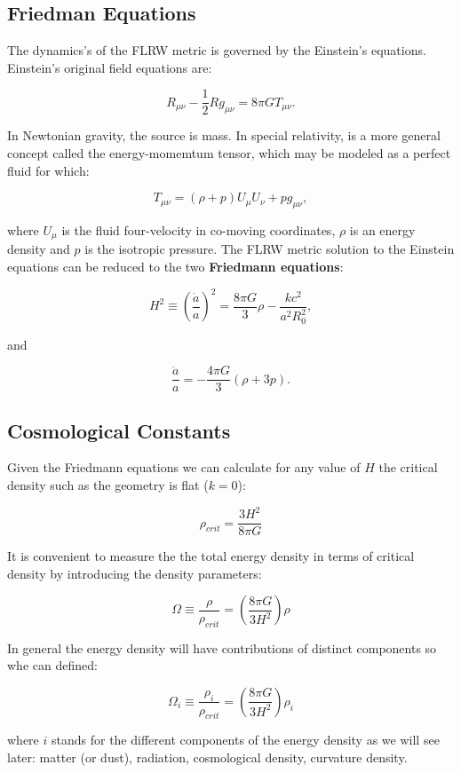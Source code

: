 \documentclass[
  letterpaper,
  DIV=11,
  numbers=noendperiod]{scrreprt}
\begin{document}
\subsection{Friedman Equations}\label{friedman-equations}

The dynamics's of the FLRW metric is governed by the Einstein's
equations. Einstein's original field equations are:

\[R_{\mu\nu} - \frac{1}{2}Rg_{\mu\nu} = 8 \pi GT_{\mu\nu}.\]

In Newtonian gravity, the source is mass. In special relativity, is a
more general concept called the energy-momemtum tensor, which may be
modeled as a perfect fluid for which:

\[T_{\mu\nu} = (\rho + p)U_\mu U_\nu + pg_{\mu\nu},\]

where \(U_\mu\) is the fluid four-velocity in co-moving coordinates,
\(\rho\) is an energy density and \(p\) is the isotropic pressure. The
FLRW metric solution to the Einstein equations can be reduced to the two
\textbf{Friedmann equations}:

\[H^2 \equiv \left(\frac{\dot a}{a}\right)^{2} =  \frac{8\pi G}{3}\rho - \frac{kc^{2}}{a^2R^2_0},\]

and

\[\frac{\ddot a}{a} = -\frac{4\pi G}{3}(\rho + 3p).\]

\subsection{Cosmological Constants}\label{cosmological-constants}

Given the Friedmann equations we can calculate for any value of \(H\)
the critical density such as the geometry is flat (\(k=0\)):

\[\rho_{crit} = \frac{3H^2}{8\pi G}\]

It is convenient to measure the the total energy density in terms of
critical density by introducing the density parameters:

\[\Omega\equiv\frac{\rho}{\rho_{crit}} = \left(\frac{8\pi G}{3H^2}\right)\rho\]

In general the energy density will have contributions of distinct
components so whe can defined:

\[\Omega_i\equiv\frac{\rho_i}{\rho_{crit}} = \left(\frac{8\pi G}{3H^2}\right)\rho_i\]

where \(i\) stands for the different components of the energy density as
we will see later: matter (or dust), radiation, cosmological density,
curvature density.
\end{document}
